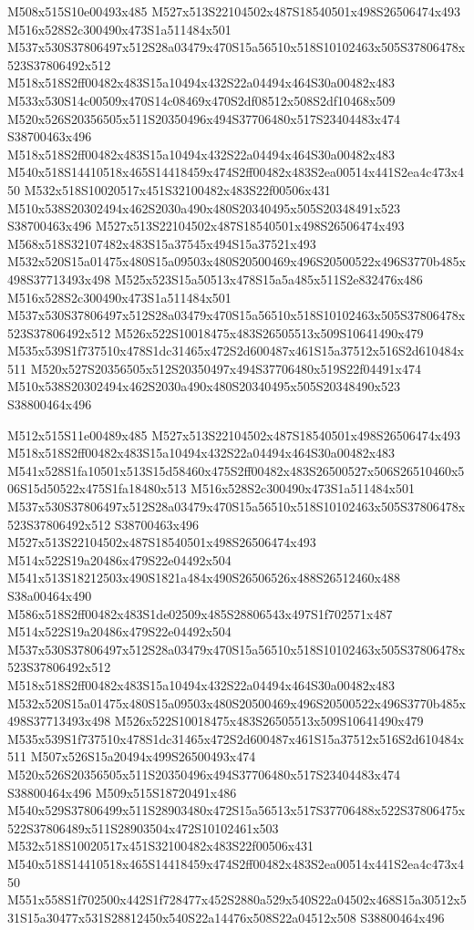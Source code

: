 \documentclass{article}
\begin{document}
\begin{multicols}{2}
M508x515S10e00493x485 M527x513S22104502x487S18540501x498S26506474x493 M516x528S2c300490x473S1a511484x501 M537x530S37806497x512S28a03479x470S15a56510x518S10102463x505S37806478x523S37806492x512 M518x518S2ff00482x483S15a10494x432S22a04494x464S30a00482x483 M533x530S14c00509x470S14c08469x470S2df08512x508S2df10468x509 M520x526S20356505x511S20350496x494S37706480x517S23404483x474 S38700463x496 M518x518S2ff00482x483S15a10494x432S22a04494x464S30a00482x483 M540x518S14410518x465S14418459x474S2ff00482x483S2ea00514x441S2ea4c473x450 M532x518S10020517x451S32100482x483S22f00506x431 M510x538S20302494x462S2030a490x480S20340495x505S20348491x523 S38700463x496 M527x513S22104502x487S18540501x498S26506474x493 M568x518S32107482x483S15a37545x494S15a37521x493 M532x520S15a01475x480S15a09503x480S20500469x496S20500522x496S3770b485x498S37713493x498 M525x523S15a50513x478S15a5a485x511S2e832476x486 M516x528S2c300490x473S1a511484x501 M537x530S37806497x512S28a03479x470S15a56510x518S10102463x505S37806478x523S37806492x512 M526x522S10018475x483S26505513x509S10641490x479 M535x539S1f737510x478S1dc31465x472S2d600487x461S15a37512x516S2d610484x511 M520x527S20356505x512S20350497x494S37706480x519S22f04491x474 M510x538S20302494x462S2030a490x480S20340495x505S20348490x523 S38800464x496

M512x515S11e00489x485 M527x513S22104502x487S18540501x498S26506474x493 M518x518S2ff00482x483S15a10494x432S22a04494x464S30a00482x483 M541x528S1fa10501x513S15d58460x475S2ff00482x483S26500527x506S26510460x506S15d50522x475S1fa18480x513 M516x528S2c300490x473S1a511484x501 M537x530S37806497x512S28a03479x470S15a56510x518S10102463x505S37806478x523S37806492x512 S38700463x496 M527x513S22104502x487S18540501x498S26506474x493 M514x522S19a20486x479S22e04492x504 M541x513S18212503x490S1821a484x490S26506526x488S26512460x488 S38a00464x490 M586x518S2ff00482x483S1de02509x485S28806543x497S1f702571x487 M514x522S19a20486x479S22e04492x504 M537x530S37806497x512S28a03479x470S15a56510x518S10102463x505S37806478x523S37806492x512 M518x518S2ff00482x483S15a10494x432S22a04494x464S30a00482x483 M532x520S15a01475x480S15a09503x480S20500469x496S20500522x496S3770b485x498S37713493x498 M526x522S10018475x483S26505513x509S10641490x479 M535x539S1f737510x478S1dc31465x472S2d600487x461S15a37512x516S2d610484x511 M507x526S15a20494x499S26500493x474 M520x526S20356505x511S20350496x494S37706480x517S23404483x474 S38800464x496 M509x515S18720491x486 M540x529S37806499x511S28903480x472S15a56513x517S37706488x522S37806475x522S37806489x511S28903504x472S10102461x503 M532x518S10020517x451S32100482x483S22f00506x431 M540x518S14410518x465S14418459x474S2ff00482x483S2ea00514x441S2ea4c473x450 M551x558S1f702500x442S1f728477x452S2880a529x540S22a04502x468S15a30512x531S15a30477x531S28812450x540S22a14476x508S22a04512x508 S38800464x496


\end{multicols}
\end{document}
